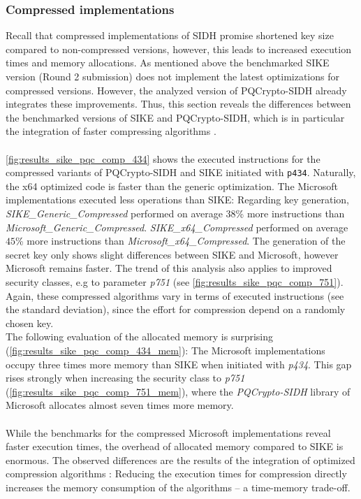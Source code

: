 \subsubsection{Compressed implementations}
Recall that compressed implementations of \gls{SIDH} promise shortened key size compared to non-compressed versions, however, this leads to increased execution times and memory allocations. As mentioned above the benchmarked \gls{SIKE} version (Round 2 submission) does not implement the latest optimizations for compressed versions. However, the analyzed version of \gls{PQCrypto-SIDH} already integrates these improvements. Thus, this section reveals the differences between the benchmarked versions of \gls{SIKE} and \gls{PQCrypto-SIDH}, which is in particular the integration of faster compressing algorithms \parencite{cryptoeprint:2020:431}.
\\\\
\autoref{fig:results_sike_pqc_comp_434} shows the executed instructions for the compressed variants of \gls{PQCrypto-SIDH} and \gls{SIKE} initiated with \texttt{p434}. Naturally, the x64 optimized code is faster than the generic optimization. The Microsoft implementations executed less operations than \gls{SIKE}: Regarding key generation, \textit{SIKE\_Generic\_Compressed} performed on average $38$\% more instructions than \textit{Microsoft\_Generic\_Compressed}. \textit{SIKE\_x64\_Compressed} performed on average $45$\% more instructions than \textit{Microsoft\_x64\_Compressed}. The generation of the secret key only shows slight differences between \gls{SIKE} and Microsoft, however Microsoft remains faster. The trend of this analysis also applies to improved security classes, e.g to parameter \textit{p751} (see \autoref{fig:results_sike_pqc_comp_751}). Again, these compressed algorithms vary in terms of executed instructions (see the standard deviation), since the effort for compression depend on a randomly chosen key.
\\
The following evaluation of the allocated memory is surprising (\autoref{fig:results_sike_pqc_comp_434_mem}): The Microsoft implementations occupy three times more memory than \gls{SIKE} when initiated with \textit{p434}. This gap rises strongly when increasing the security class to \textit{p751} (\autoref{fig:results_sike_pqc_comp_751_mem}), where the \textit{ \gls{PQCrypto-SIDH}} library of Microsoft allocates almost seven times more memory.
\\\\
While the benchmarks for the compressed Microsoft implementations reveal faster execution times, the overhead of allocated memory compared to \gls{SIKE} is enormous. The observed differences are the results of the integration of optimized compression algorithms \parencite{cryptoeprint:2020:431}: Reducing the execution times for compression directly increases the memory consumption of the algorithms -- a time-memory trade-off.


